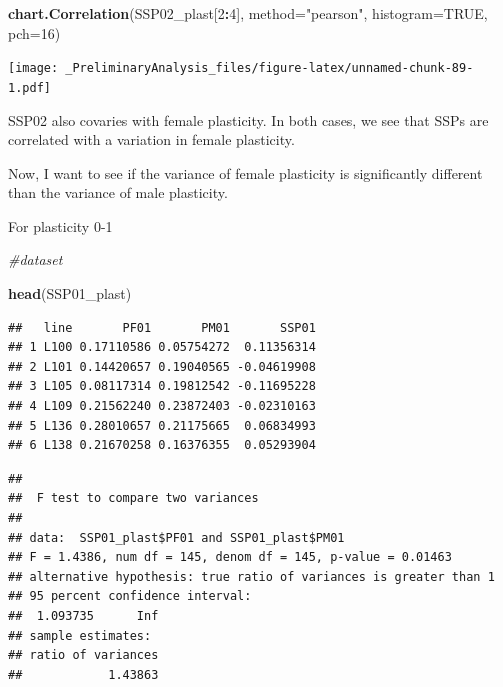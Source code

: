 \documentclass[
]{article}
\newenvironment{Shaded}{\begin{snugshade}}{\end{snugshade}}
\newcommand{\CommentTok}[1]{\textcolor[rgb]{0.56,0.35,0.01}{\textit{#1}}}
\newcommand{\DataTypeTok}[1]{\textcolor[rgb]{0.13,0.29,0.53}{#1}}
\newcommand{\DecValTok}[1]{\textcolor[rgb]{0.00,0.00,0.81}{#1}}
\newcommand{\KeywordTok}[1]{\textcolor[rgb]{0.13,0.29,0.53}{\textbf{#1}}}
\newcommand{\NormalTok}[1]{#1}
\newcommand{\OperatorTok}[1]{\textcolor[rgb]{0.81,0.36,0.00}{\textbf{#1}}}
\newcommand{\OtherTok}[1]{\textcolor[rgb]{0.56,0.35,0.01}{#1}}
\newcommand{\StringTok}[1]{\textcolor[rgb]{0.31,0.60,0.02}{#1}}
\begin{document}
\begin{Shaded}
\begin{Highlighting}[]
\KeywordTok{chart.Correlation}\NormalTok{(SSP02_plast[}\DecValTok{2}\OperatorTok{:}\DecValTok{4}\NormalTok{],}
                   \DataTypeTok{method=}\StringTok{"pearson"}\NormalTok{,}
                   \DataTypeTok{histogram=}\OtherTok{TRUE}\NormalTok{,}
                   \DataTypeTok{pch=}\DecValTok{16}\NormalTok{)}
\end{Highlighting}
\end{Shaded}

\texttt{[image: \_PreliminaryAnalysis\_files/figure-latex/unnamed-chunk-89-1.pdf]}

SSP02 also covaries with female plasticity. In both cases, we see that
SSPs are correlated with a variation in female plasticity.

Now, I want to see if the variance of female plasticity is significantly
different than the variance of male plasticity.

For plasticity 0-1

\begin{Shaded}
\begin{Highlighting}[]
\CommentTok{#dataset }

\KeywordTok{head}\NormalTok{(SSP01_plast)}
\end{Highlighting}
\end{Shaded}

\begin{verbatim}
##   line       PF01       PM01       SSP01
## 1 L100 0.17110586 0.05754272  0.11356314
## 2 L101 0.14420657 0.19040565 -0.04619908
## 3 L105 0.08117314 0.19812542 -0.11695228
## 4 L109 0.21562240 0.23872403 -0.02310163
## 5 L136 0.28010657 0.21175665  0.06834993
## 6 L138 0.21670258 0.16376355  0.05293904
\end{verbatim}

\begin{Shaded}
\end{Shaded}

\begin{verbatim}
## 
##  F test to compare two variances
## 
## data:  SSP01_plast$PF01 and SSP01_plast$PM01
## F = 1.4386, num df = 145, denom df = 145, p-value = 0.01463
## alternative hypothesis: true ratio of variances is greater than 1
## 95 percent confidence interval:
##  1.093735      Inf
## sample estimates:
## ratio of variances 
##            1.43863
\end{verbatim}
\end{document}
